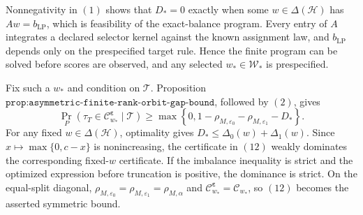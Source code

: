 Nonnegativity in \((1)\) shows that \(D_*=0\) exactly when some \(w\in\Delta(\mathcal H)\) has \(Aw=b_{\mathrm{LP}}\), which is feasibility of the exact-balance program. Every entry of \(A\) integrates a declared selector kernel against the known assignment law, and \(b_{\mathrm{LP}}\) depends only on the prespecified target rule. Hence the finite program can be solved before scores are observed, and any selected \(w_*\in\mathcal W_*\) is prespecified.

Fix such a \(w_*\) and condition on \(\mathcal T\). Proposition \(\texttt{prop:asymmetric-finite-rank-orbit-gap-bound}\), followed by \((2)\), gives
\[
\Pr_P\!\left(\tau_T\in\mathcal C^{\boldsymbol\varepsilon}_{w_*}\mid\mathcal T\right)\ge\max\!\left\{0,1-\rho_{M,\varepsilon_0}-\rho_{M,\varepsilon_1}-D_*\right\}.\tag{12}
\]
For any fixed \(w\in\Delta(\mathcal H)\), optimality gives \(D_*\le\Delta_0(w)+\Delta_1(w)\). Since \(x\mapsto\max\{0,c-x\}\) is nonincreasing, the certificate in \((12)\) weakly dominates the corresponding fixed-\(w\) certificate. If the imbalance inequality is strict and the optimized expression before truncation is positive, the dominance is strict. On the equal-split diagonal, \(\rho_{M,\varepsilon_0}=\rho_{M,\varepsilon_1}=\rho_{M,\alpha}\) and \(\mathcal C^{\boldsymbol\varepsilon}_{w_*}=\mathcal C_{w_*}\), so \((12)\) becomes the asserted symmetric bound.